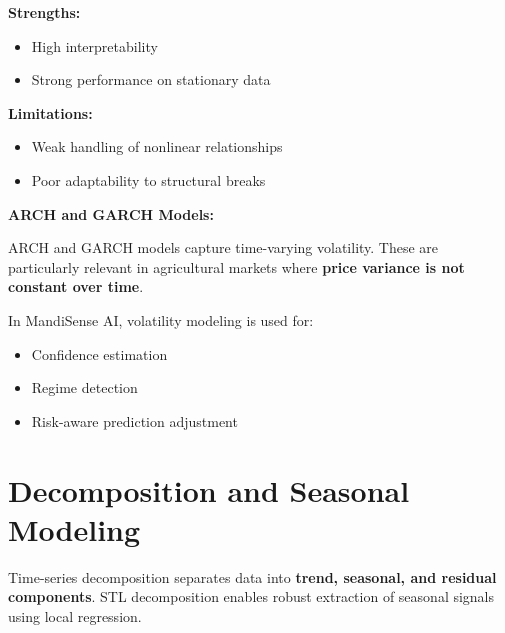 \documentclass[12pt,a4paper]{report}
\begin{document}
\vspace{0.4em}

\noindent
\textbf{Strengths:}
\begin{itemize}
    \item High interpretability
    \item Strong performance on stationary data
\end{itemize}

\textbf{Limitations:}
\begin{itemize}
    \item Weak handling of nonlinear relationships
    \item Poor adaptability to structural breaks
\end{itemize}

\vspace{0.4em}

\noindent
\textbf{ARCH and GARCH Models:}

\vspace{0.3em}

\noindent
ARCH \cite{engle1982} and GARCH \cite{bollerslev1986} models capture time-varying volatility. These are particularly relevant in agricultural markets where \textbf{price variance is not constant over time}.

\vspace{0.4em}

\noindent
In MandiSense AI, volatility modeling is used for:
\begin{itemize}
    \item Confidence estimation
    \item Regime detection
    \item Risk-aware prediction adjustment
\end{itemize}

\vspace{0.7em}


\section{Decomposition and Seasonal Modeling}

\noindent
Time-series decomposition separates data into \textbf{trend, seasonal, and residual components}. STL decomposition \cite{cleveland1990} enables robust extraction of seasonal signals using local regression.

\vspace{0.4em}
\end{document}
